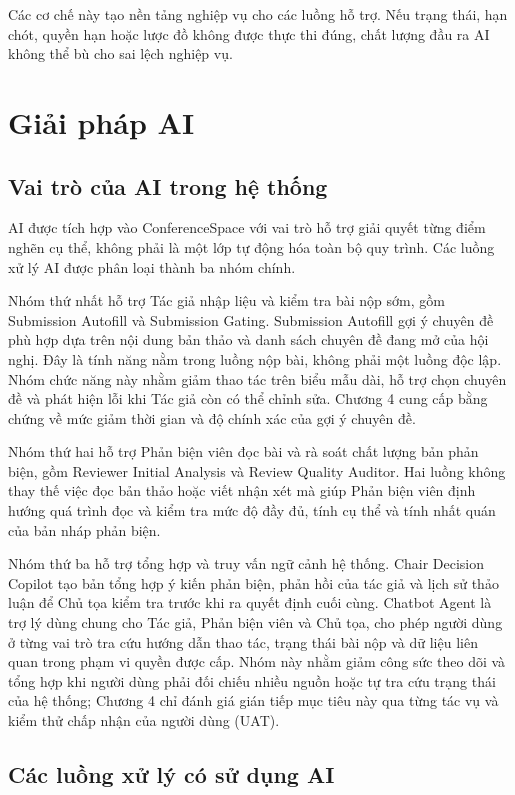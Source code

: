 Các cơ chế này tạo nền tảng nghiệp vụ cho các luồng hỗ trợ. Nếu trạng thái, hạn chót, quyền hạn hoặc lược đồ không được thực thi đúng, chất lượng đầu ra AI không thể bù cho sai lệch nghiệp vụ.

\section{Giải pháp AI}

\subsection{Vai trò của AI trong hệ thống}

AI được tích hợp vào ConferenceSpace với vai trò hỗ trợ giải quyết từng điểm nghẽn cụ thể, không phải là một lớp tự động hóa toàn bộ quy trình. Các luồng xử lý AI được phân loại thành ba nhóm chính.

Nhóm thứ nhất hỗ trợ Tác giả nhập liệu và kiểm tra bài nộp sớm, gồm Submission Autofill và Submission Gating. Submission Autofill gợi ý chuyên đề phù hợp dựa trên nội dung bản thảo và danh sách chuyên đề đang mở của hội nghị. Đây là tính năng nằm trong luồng nộp bài, không phải một luồng độc lập. Nhóm chức năng này nhằm giảm thao tác trên biểu mẫu dài, hỗ trợ chọn chuyên đề và phát hiện lỗi khi Tác giả còn có thể chỉnh sửa. Chương 4 cung cấp bằng chứng về mức giảm thời gian và độ chính xác của gợi ý chuyên đề.

Nhóm thứ hai hỗ trợ Phản biện viên đọc bài và rà soát chất lượng bản phản biện, gồm Reviewer Initial Analysis và Review Quality Auditor. Hai luồng không thay thế việc đọc bản thảo hoặc viết nhận xét mà giúp Phản biện viên định hướng quá trình đọc và kiểm tra mức độ đầy đủ, tính cụ thể và tính nhất quán của bản nháp phản biện.

Nhóm thứ ba hỗ trợ tổng hợp và truy vấn ngữ cảnh hệ thống. Chair Decision Copilot tạo bản tổng hợp ý kiến phản biện, phản hồi của tác giả và lịch sử thảo luận để Chủ tọa kiểm tra trước khi ra quyết định cuối cùng. Chatbot Agent là trợ lý dùng chung cho Tác giả, Phản biện viên và Chủ tọa, cho phép người dùng ở từng vai trò tra cứu hướng dẫn thao tác, trạng thái bài nộp và dữ liệu liên quan trong phạm vi quyền được cấp. Nhóm này nhằm giảm công sức theo dõi và tổng hợp khi người dùng phải đối chiếu nhiều nguồn hoặc tự tra cứu trạng thái của hệ thống; Chương 4 chỉ đánh giá gián tiếp mục tiêu này qua từng tác vụ và kiểm thử chấp nhận của người dùng (UAT).

\subsection{Các luồng xử lý có sử dụng AI}

